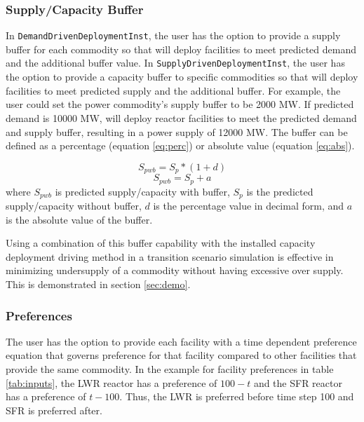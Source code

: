     \subsubsection{\textbf{Supply/Capacity Buffer}}
    In \texttt{DemandDrivenDeploymentInst}, the user has the option 
    to provide a supply buffer for each commodity so that 
    \deploy will deploy facilities to meet predicted demand and the
    additional buffer value. 
    In \texttt{SupplyDrivenDeploymentInst}, the user has the option 
    to provide a capacity buffer to specific commodities so that 
    \deploy will deploy facilities to meet predicted supply and the
    additional buffer.
    For example, the user could set the power commodity's supply buffer 
    to be 2000 MW. 
    If predicted demand is 10000 MW, \deploy will deploy reactor 
    facilities to meet the predicted demand and supply buffer, resulting 
    in a power supply of 12000 MW.  
    The buffer can be defined as a percentage (equation \ref{eq:perc}) 
    or absolute value (equation \ref{eq:abs}). 
    
    \begin{equation}
        \label{eq:perc}
        S_{pwb} = S_{p}*(1+d)
    \end{equation}
    \begin{equation}
        \label{eq:abs}
        S_{pwb} = S_{p}+a
    \end{equation}
    where $S_{pwb}$ is predicted supply/capacity with buffer, 
    $S_p$ is the predicted supply/capacity without buffer, 
    $d$ is the percentage value in decimal form, 
    and $a$ is the absolute value of the buffer. 
    
    Using a combination of this buffer capability with the 
    installed capacity deployment driving method in a transition 
    scenario simulation is effective in minimizing undersupply of a 
    commodity without having excessive over supply. 
    This is demonstrated in section \ref{sec:demo}. 
    
    \subsubsection{\textbf{Preferences}}
    The user has the option to provide each facility with
    a time dependent preference equation that governs preference for 
    that facility compared to other facilities that provide the same 
    commodity. 
    In the example for facility preferences in table \ref{tab:inputs}, 
    the \gls{LWR} reactor has a preference of $100-t$ and the 
    \gls{SFR} reactor has a preference of $t-100$. 
    Thus, the \gls{LWR} is preferred before time step 100 and \gls{SFR}
    is preferred after. 
    

